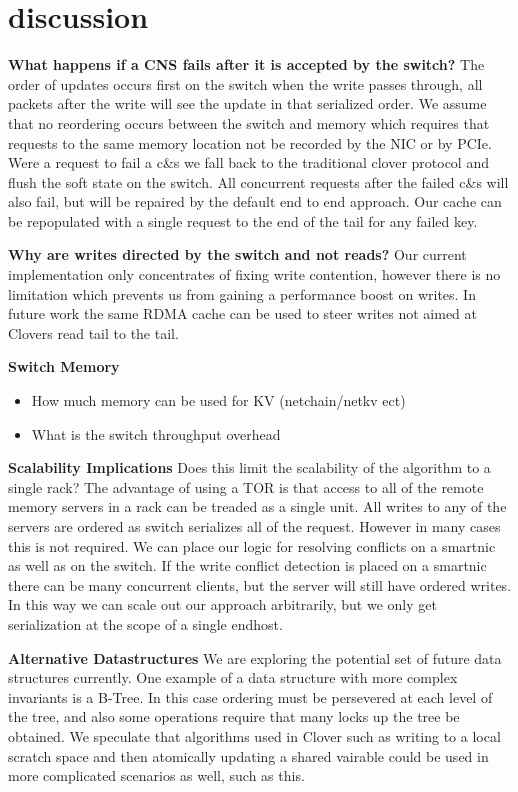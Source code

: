 \section{discussion}

\textbf{What happens if a CNS fails after it is accepted by the switch?}
The order of updates occurs first on the switch when the write passes
through, all packets after the write will see the update in that serialized
order. We assume that no reordering occurs between the switch and memory
which requires that requests to the same memory location not be recorded by
the NIC or by PCIe. Were a request to fail a c\&s we fall back to the
traditional clover protocol and flush the soft state on the switch. All
concurrent requests after the failed c\&s will also fail, but will be repaired
by the default end to end approach. Our cache can be repopulated with a single
request to the end of the tail for any failed key.

\textbf{Why are writes directed by the switch and not reads?}
Our current implementation only concentrates of fixing write contention,
however there is no limitation which prevents us from gaining a performance
boost on writes. In future work the same RDMA cache can be used to steer
writes not aimed at Clovers read tail to the tail.

\textbf{Switch Memory}
\begin{itemize}
    \item{How much memory can be used for KV (netchain/netkv ect)}
    \item{What is the switch throughput overhead}
\end{itemize}


\textbf{Scalability Implications}
Does this limit the scalability of the
algorithm to a single rack? The advantage of using a TOR is that access to
all of the remote memory servers in a rack can be treaded as a single unit.
All writes to any of the servers are ordered as switch serializes all of the
request. However in many cases this is not required. We can place our logic
for resolving conflicts on a smartnic as well as on the switch. If the write
conflict detection is placed on a smartnic there can be many concurrent
clients, but the server will still have ordered writes. In this way we can
scale out our approach arbitrarily, but we only get serialization at the scope
of a single endhost.

\textbf{Alternative Datastructures}
We are exploring the potential set of future data structures currently. One
example of a data structure with more complex invariants is a B-Tree. In this
case ordering must be persevered at each level of the tree, and also some
operations require that many locks up the tree be obtained. We speculate that
algorithms used in Clover such as writing to a local scratch space and then
atomically updating a shared vairable could be used in more complicated
scenarios as well, such as this.

